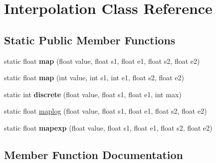 \hypertarget{classInterpolation}{}\section{Interpolation Class Reference}
\label{classInterpolation}
\subsection*{Static Public Member Functions}
\begin{DoxyCompactItemize}
\item 
static float {\bfseries map} (float value, float s1, float e1, float s2, float e2)\hypertarget{classInterpolation_adfd3003c39c40ec76342274c65017761}{}\label{classInterpolation_adfd3003c39c40ec76342274c65017761}

\item 
static float {\bfseries map} (int value, int s1, int e1, float s2, float e2)\hypertarget{classInterpolation_ac6eab12deb9f79b79200aad3b219e7c3}{}\label{classInterpolation_ac6eab12deb9f79b79200aad3b219e7c3}

\item 
static int {\bfseries discrete} (float value, float s1, float e1, int max)\hypertarget{classInterpolation_a246c72a835822b7674758d657ed44230}{}\label{classInterpolation_a246c72a835822b7674758d657ed44230}

\item 
static float \hyperlink{classInterpolation_a5549f8859f14153da891222a8ff1a22f}{maplog} (float value, float s1, float e1, float s2, float e2)
\item 
static float {\bfseries mapexp} (float value, float s1, float e1, float s2, float e2)\hypertarget{classInterpolation_a08d1fe5e82708ab26a019e9ae9f851c8}{}\label{classInterpolation_a08d1fe5e82708ab26a019e9ae9f851c8}

\end{DoxyCompactItemize}


\subsection{Member Function Documentation}
